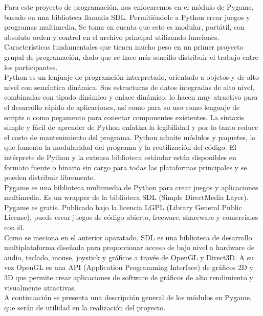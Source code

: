 \documentclass[12pt,letterpaper]{article}
\begin{document}
\indent Para este proyecto de programación, nos enfocaremos en el módulo de Pygame, basado en una biblioteca llamada SDL. Permitiéndole a Python crear juegos y programas multimedia. Se toma en cuenta que este es modular, portátil, con absoluto orden y control en el archivo principal utilizando funciones. Características fundamentales que tienen mucho peso en un primer proyecto grupal de programación, dado que se hace más sencillo distribuir el trabajo entre los participantes.\vspace{5mm}\\
\indent Python es un lenjuaje de programción interpretado, orientado a objetos y de alto nivel con semántica dinámica. Sus estructuras de datos integradas de alto nivel, combinadas con tipado dinámico y enlace dinámico, lo hacen muy atractivo para el desarrollo rápido de aplicaciones, así como para su uso como lenguaje de scripts o como pegamento para conectar componentes existentes. La sintaxis simple y fácil de aprender de Python enfatiza la legibilidad y por lo tanto reduce el costo de mantenimiento del programa. Python admite módulos y paquetes, lo que fomenta la modularidad del programa y la reutilización del código. El intérprete de Python y la extensa biblioteca estándar están disponibles en formato fuente o binario sin cargo para todas las plataformas principales y se pueden distribuir libremente.\vspace{5mm} \\
\indent Pygame es una biblioteca multimedia de Python para crear juegos y aplicaciones multimedia. Es un wrapper de la biblioteca SDL (Simple DirectMedia Layer). Pygame es gratis. Publicado bajo la licencia LGPL (Library General Public License), puede crear juegos de código abierto, freeware, shareware y comerciales con él. \vspace{5mm} \\
\indent Como se meciona en el anterior aparatado, SDL es una biblioteca de desarrollo multiplataforma diseñada para proporcionar acceso de bajo nivel a hardware de audio, teclado, mouse, joystick y gráficos a través de OpenGL y Direct3D. A su vez OpenGL es una API (Application Programming Interface) de gráficos 2D y 3D que permite crear aplicaciones de software de gráficos de alto rendimiento y visualmente atractivas.\vspace{5mm} \\
\indent A continuación se presenta una descripción general de los módulos en Pygame, que serán de utilidad en la realización del proyecto.
\end{document}
